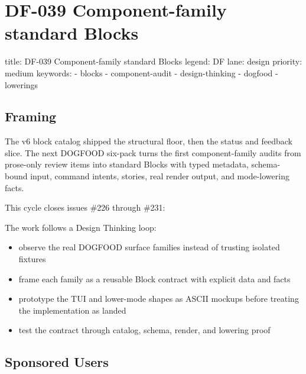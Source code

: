 \chapter{DF-039 Component-family standard Blocks}\label{record-094}

\smallskip

\begin{RecordMeta}
title: DF-039 Component-family standard Blocks
legend: DF
lane: design
priority: medium
keywords:
  - blocks
  - component-audit
  - design-thinking
  - dogfood
  - lowerings

\end{RecordMeta}

\section{Framing}\label{record-094-framing}

The v6 block catalog shipped the structural floor, then the status and feedback slice. The next DOGFOOD six-pack turns the first component-family audits from prose-only review items into standard Blocks with typed metadata, schema-bound input, command intents, stories, real render output, and mode-lowering facts.

This cycle closes issues \#226 through \#231:



The work follows a Design Thinking loop:

\begin{itemize}
\tightlist
\item
  observe the real DOGFOOD surface families instead of trusting isolated fixtures
\item
  frame each family as a reusable Block contract with explicit data and facts
\item
  prototype the TUI and lower-mode shapes as ASCII mockups before treating the implementation as landed
\item
  test the contract through catalog, schema, render, and lowering proof
\end{itemize}

\section{Sponsored Users}\label{record-094-sponsored-users}

